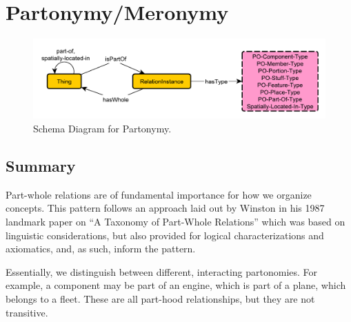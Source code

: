 \section{Partonymy/Meronymy}
\label{sec:Partonymy}
\begin{figure}[h!]
\begin{center}
\includegraphics[width=.7\textwidth]{figures/partonymy}
\end{center}
\caption{Schema Diagram for Partonymy.}
\label{fig:Partonymy}
\end{figure}
\subsection{Summary}
\label{sum:Partonymy}
Part-whole relations are of fundamental importance for how we organize concepts. This pattern follows an approach laid out by Winston in his 1987 landmark paper on ``A Taxonomy of Part-Whole Relations'' \cite{citeulike:171338} which was based on linguistic considerations, but also provided for logical characterizations and axiomatics, and, as such, inform the pattern.

Essentially, we distinguish between different, interacting partonomies. For example, a component may be part of an engine, which is part of a plane, which belongs to a fleet. These are all part-hood relationships, but they are not transitive.

